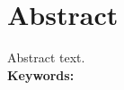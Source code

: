 
\newpage
\thispagestyle{empty}
\chapter*{\sffamily Abstract}
%
\begin{center}
\textbf{\large \thesisnameeng}
\end{center}
\par Abstract text.
\\[2cm]
\textbf{Keywords:} \keywords

